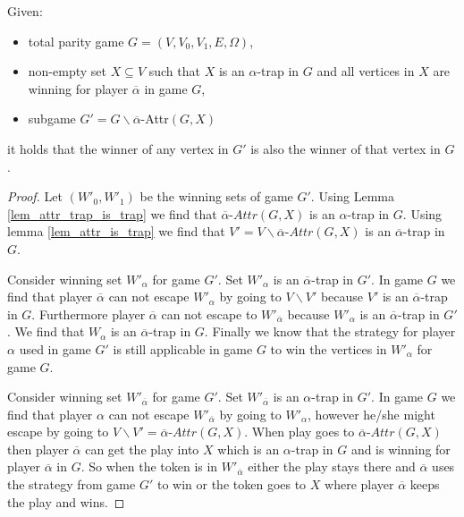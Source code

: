 \begin{lemma}
\label{lem_GwithoutB_is_subset}
	Given:
	\begin{itemize}
		\item total parity game $G = (V,V_0,V_1,E,\Omega)$,
		\item non-empty set $X \subseteq V$ such that $X$ is an $\alpha$-trap in $G$ and all vertices in $X$ are winning for player $\overline{\alpha}$ in game $G$,
		\item subgame $G' = G\backslash \overline{\alpha}$-Attr$(G,X)$
	\end{itemize}
	it holds that the winner of any vertex in $G'$ is also the winner of that vertex in $G$.
	\begin{proof}
		Let $(W'_0, W'_1)$ be the winning sets of game $G'$. Using Lemma \ref{lem_attr_trap_is_trap} we find that $\overline{\alpha}\textit{-Attr}(G,X)$ is an $\alpha$-trap in $G$. Using lemma \ref{lem_attr_is_trap} we find that $V' = V\backslash \overline{\alpha}\textit{-Attr}(G,X)$ is an $\overline{\alpha}$-trap in $G$.
		
		Consider winning set $W'_\alpha$ for game $G'$. Set $W'_\alpha$ is an $\overline{\alpha}$-trap in $G'$. In game $G$ we find that player $\overline{\alpha}$ can not escape $W'_\alpha$ by going to $V\backslash  V'$ because $V'$ is an $\overline{\alpha}$-trap in $G$. Furthermore player $\overline{\alpha}$ can not escape to $W'_{\overline{\alpha}}$ because $W'_\alpha$ is an $\overline{\alpha}$-trap in $G'$. We find that $W_\alpha$ is an $\overline{\alpha}$-trap in $G$. Finally we know that the strategy for player $\alpha$ used in game $G'$ is still applicable in game $G$ to win the vertices in $W'_\alpha$ for game $G$.
		
		Consider winning set $W'_{\overline{\alpha}}$ for game $G'$. Set $W'_{\overline{\alpha}}$ is an $\alpha$-trap in $G'$. In game $G$ we find that player $\alpha$ can not escape $W'_{\overline{\alpha}}$ by going to $W'_\alpha$, however he/she might escape by going to $V\backslash V' = \overline{\alpha}\textit{-Attr}(G,X)$. When play goes to $\overline{\alpha}\textit{-Attr}(G,X)$ then player $\overline{\alpha}$ can get the play into $X$ which is an $\alpha$-trap in $G$ and is winning for player $\overline{\alpha}$ in $G$. So when the token is in $W'_{\overline{\alpha}}$ either the play stays there and $\overline{\alpha}$ uses the strategy from game $G'$ to win or the token goes to $X$ where player $\overline{\alpha}$ keeps the play and wins.
	\end{proof}
\end{lemma}
